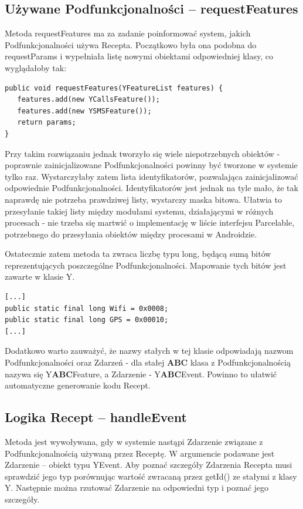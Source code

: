 \documentclass[11pt,a4paper,polish,thesis]{dcsbook}
\begin{document}
\subsection{Używane Podfunkcjonalności -- requestFeatures}
Metoda requestFeatures ma za zadanie poinformować system, jakich Podfunkcjonalności używa Recepta. Początkowo była ona podobna do requestParams i wypełniała listę nowymi obiektami odpowiedniej klasy, co wyglądałoby tak:
\begin{verbatim}
public void requestFeatures(YFeatureList features) {
   features.add(new YCallsFeature());
   features.add(new YSMSFeature());
   return params;
}
\end{verbatim}
Przy takim rozwiązaniu jednak tworzyło się wiele niepotrzebnych obiektów - poprawnie zainicjalizowane Podfunkcjonalności powinny być tworzone w systemie tylko raz. Wystarczyłaby zatem lista identyfikatorów, pozwalająca zainicjalizować odpowiednie Podfunkcjonalności. Identyfikatorów jest jednak na tyle mało, że tak naprawdę nie potrzeba prawdziwej listy, wystarczy maska bitowa. Ułatwia to przesyłanie takiej listy między modułami systemu, działającymi w różnych procesach - nie trzeba się martwić o implementację w liście interfejsu Parcelable, potrzebnego do przesyłania obiektów między procesami w Androidzie.

Ostatecznie zatem metoda ta zwraca liczbę typu long, będącą sumą bitów reprezentujących poszczególne Podfunkcjonalności. Mapowanie tych bitów jest zawarte w klasie Y.
\begin{verbatim}
[...]
public static final long Wifi = 0x0008;
public static final long GPS = 0x00010;
[...]
\end{verbatim}
Dodatkowo warto zauważyć, że nazwy stałych w tej klasie odpowiadają nazwom Podfunkcjonalności oraz Zdarzeń - dla stałej {\bf ABC} klasa z Podfunkcjonalnością nazywa się Y{\bf ABC}Feature, a Zdarzenie - Y{\bf ABC}Event. Powinno to ułatwić automatyczne generowanie kodu Recept. 

\subsection{Logika Recept -- handleEvent}
Metoda jest wywoływana, gdy w systemie nastąpi Zdarzenie związane z Podfunkcjonalnością używaną przez Receptę. W argumencie podawane jest Zdarzenie -- obiekt typu YEvent. 
Aby poznać szczegóły Zdarzenia Recepta musi sprawdzić jego typ porównując wartość zwracaną przez getId() ze stałymi z klasy Y. Następnie można rzutować Zdarzenie na odpowiedni typ i poznać jego szczegóły. 
\end{document}
